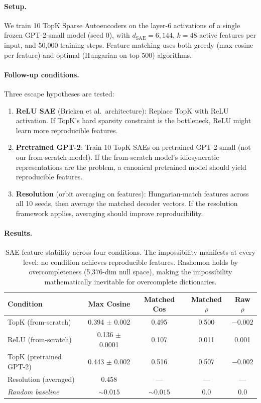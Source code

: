 \documentclass{article}
\begin{document}
\paragraph{Setup.}
We train 10 TopK Sparse Autoencoders on the layer-6 activations of a single frozen GPT-2-small model (seed 0), with $d_{\text{SAE}} = 6{,}144$, $k = 48$ active features per input, and 50{,}000 training steps. Feature matching uses both greedy (max cosine per feature) and optimal (Hungarian on top 500) algorithms.

\paragraph{Follow-up conditions.}
Three escape hypotheses are tested:
\begin{enumerate}
  \item \textbf{ReLU SAE} (Bricken et al.\ architecture): Replace TopK with ReLU activation. If TopK's hard sparsity constraint is the bottleneck, ReLU might learn more reproducible features.
  \item \textbf{Pretrained GPT-2}: Train 10 TopK SAEs on pretrained GPT-2-small (not our from-scratch model). If the from-scratch model's idiosyncratic representations are the problem, a canonical pretrained model should yield reproducible features.
  \item \textbf{Resolution} (orbit averaging on features): Hungarian-match features across all 10 seeds, then average the matched decoder vectors. If the resolution framework applies, averaging should improve reproducibility.
\end{enumerate}

\paragraph{Results.}

\begin{table}[ht]
\centering
\caption{SAE feature stability across four conditions. The impossibility manifests at every level: no condition achieves reproducible features. Rashomon holds by overcompleteness (5{,}376-dim null space), making the impossibility mathematically inevitable for overcomplete dictionaries.}
\label{tab:sae-comparison}
\small
\begin{tabular}{lcccc}
\toprule
\textbf{Condition} & \textbf{Max Cosine} & \textbf{Matched Cos} & \textbf{Matched $\rho$} & \textbf{Raw $\rho$} \\
\midrule
TopK (from-scratch) & 0.394 $\pm$ 0.002 & 0.495 & 0.500 & $-0.002$ \\
ReLU (from-scratch) & 0.136 $\pm$ 0.0001 & 0.107 & 0.011 & 0.001 \\
TopK (pretrained GPT-2) & 0.443 $\pm$ 0.002 & 0.516 & 0.507 & $-0.002$ \\
Resolution (averaged) & 0.458 & --- & --- & --- \\
\midrule
\emph{Random baseline} & ${\sim}0.015$ & ${\sim}0.015$ & 0.0 & 0.0 \\
\bottomrule
\end{tabular}
\end{table}
\end{document}
